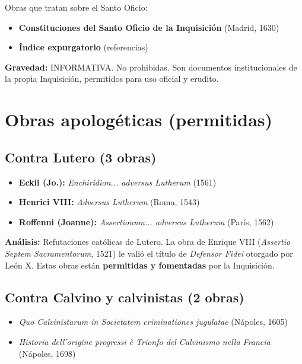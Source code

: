 \documentclass[12pt,a4paper]{article}
\begin{document}
Obras que tratan sobre el Santo Oficio:

\begin{itemize}
    \item \textbf{Constituciones del Santo Oficio de la Inquisición} (Madrid, 1630)
    \item \textbf{Índice expurgatorio} (referencias)
\end{itemize}

\textbf{Gravedad:} INFORMATIVA. No prohibidas. Son documentos institucionales de la propia Inquisición, permitidos para uso oficial y erudito.

\section{Obras apologéticas (permitidas)}

\subsection{Contra Lutero (3 obras)}

\begin{itemize}
    \item \textbf{Eckii (Jo.):} \textit{Enchiridion... adversus Lutherum} (1561)
    \item \textbf{Henrici VIII:} \textit{Adversus Lutherum} (Roma, 1543)
    \item \textbf{Roffenni (Joanne):} \textit{Assertionum... adversus Lutherum} (París, 1562)
\end{itemize}

\textbf{Análisis:} Refutaciones católicas de Lutero. La obra de Enrique VIII (\textit{Assertio Septem Sacramentorum}, 1521) le valió el título de \textit{Defensor Fidei} otorgado por León X. Estas obras están \textbf{permitidas y fomentadas} por la Inquisición.

\subsection{Contra Calvino y calvinistas (2 obras)}

\begin{itemize}
    \item \textit{Quo Calvinistarum in Societatem criminationes jugulatae} (Nápoles, 1605)
    \item \textit{Historia dell'origine progressi è Trionfo del Calvinismo nella Francia} (Nápoles, 1698)
\end{itemize}
\end{document}
